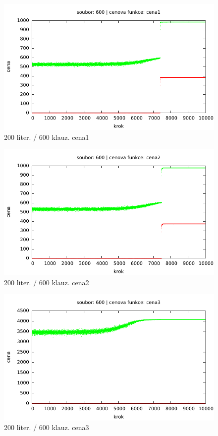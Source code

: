 \documentclass[12pt,a4paper]{article}
\begin{document}
\begin{figure}[H]
	\caption{200 liter. / 600 klauz. cena1}
 	\centerline{\includegraphics{"../results/600cost1"}}
\end{figure}
\begin{figure}[H]
	\caption{200 liter. / 600 klauz. cena2}
 	\centerline{\includegraphics{"../results/600cost2"}}
\end{figure}
\begin{figure}[H]
	\caption{200 liter. / 600 klauz. cena3}
 	\centerline{\includegraphics{"../results/600cost3"}}
\end{figure}
\end{document}
